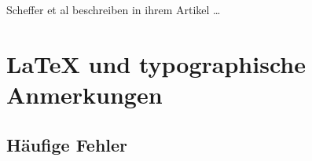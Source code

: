 \documentclass[twoside, a4paper, DIV=11, open=any, bibliography=totoc]{scrbook}
\begin{document}
\blindtext

Scheffer et al beschreiben in ihrem Artikel \ldots ~\cite{SchefferRegimeNature}

\blindtext


\chapter{\LaTeX{} und typographische Anmerkungen} \label{chap:latexRes}

\section{Häufige Fehler} \label{sec:fehler}
\end{document}
